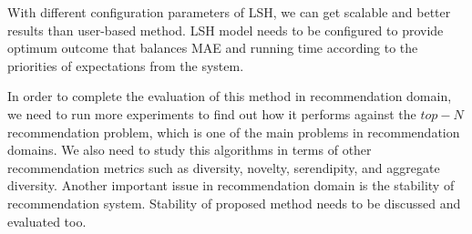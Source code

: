 \documentclass[conference]{IEEEtran}
\begin{document}
With different configuration parameters of LSH, we can get scalable and 
better results than user-based method. LSH model needs to be
configured to provide optimum outcome that balances MAE  and running time
according to the priorities of expectations from the system.

In order to complete the evaluation of this method in recommendation domain, 
we need to run more experiments to find out how it performs against the $top-N$ 
recommendation problem, which is one of the main problems in recommendation 
domains. We also need to study this algorithms in terms of other recommendation 
metrics such as diversity, novelty, serendipity, and aggregate diversity. 
Another important issue in recommendation domain is the stability of 
recommendation system. Stability of proposed method needs to be discussed and 
evaluated too. 


 

\end{document}
